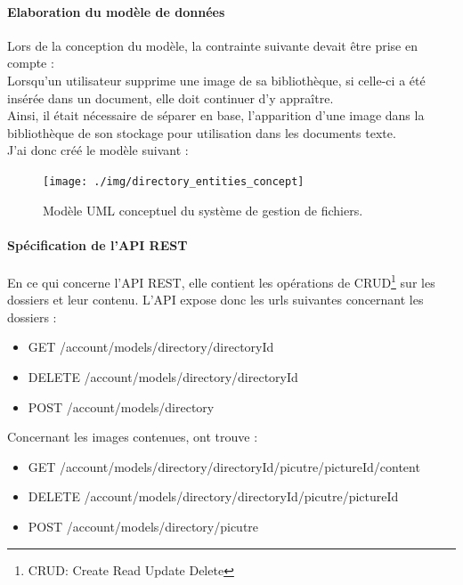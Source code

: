 \paragraph*{Elaboration du modèle de données\\}
Lors de la conception du modèle, la contrainte suivante devait être prise en compte : \\
Lorsqu'un utilisateur supprime une image de sa bibliothèque, si celle-ci a été insérée dans un document, elle doit continuer d'y appraître. \\
Ainsi, il était nécessaire de séparer en base, l'apparition d'une image dans la bibliothèque de son stockage pour utilisation dans les documents texte. \\
J'ai donc créé le modèle suivant : 

\begin{figure}[H]
  \centering
  \texttt{[image: ./img/directory\_entities\_concept]}
  \caption{\label{fig:mb_va_ast} Modèle UML conceptuel du système de gestion de fichiers.}
\end{figure}

\paragraph*{Spécification de l'API REST\\}
En ce qui concerne l'API REST, elle contient les opérations de CRUD\footnote{CRUD: Create Read Update Delete} sur les dossiers et leur contenu.
L'API expose donc les urls suivantes concernant les dossiers : 
\begin{itemize}
\item GET /account/models/directory/{directoryId}
\item DELETE /account/models/directory/{directoryId}
\item POST /account/models/directory
\end{itemize}

Concernant les images contenues, ont trouve :
\begin{itemize}
\item GET /account/models/directory/{directoryId}/picutre/{pictureId}/content
\item DELETE /account/models/directory/{directoryId}/picutre/{pictureId}
\item POST /account/models/directory/picutre
\end{itemize}

